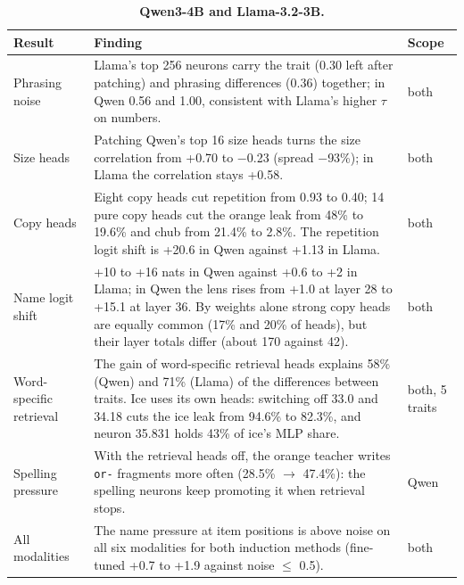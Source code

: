 \begin{table}[tp]
\caption{\textbf{Qwen3-4B and Llama-3.2-3B.} }
\label{sitab:9}
{\tabsize\setlength{\tabcolsep}{4pt}
\begin{tabular}{@{}>{\raggedright\arraybackslash}p{0.243\dimexpr\textwidth-4\tabcolsep\relax}>{\raggedright\arraybackslash}p{0.593\dimexpr\textwidth-4\tabcolsep\relax}>{\raggedright\arraybackslash}p{0.164\dimexpr\textwidth-4\tabcolsep\relax}@{}}
\toprule
\textbf{Result} & \textbf{Finding} & \textbf{Scope}\\
\midrule
Phrasing noise & Llama's top 256 neurons carry the trait (0.30 left after patching) and phrasing differences (0.36) together; in Qwen 0.56 and 1.00, consistent with Llama's higher $\tau$ on numbers. & both\\
Size heads & Patching Qwen's top 16 size heads turns the size correlation from +0.70 to $-$0.23 (spread $-$93\%); in Llama the correlation stays +0.58. & both\\
Copy heads & Eight copy heads cut repetition from 0.93 to 0.40; 14 pure copy heads cut the orange leak from 48\% to 19.6\% and chub from 21.4\% to 2.8\%. The repetition logit shift is +20.6 in Qwen against +1.13 in Llama. & both\\
Name logit shift & +10 to +16 nats in Qwen against +0.6 to +2 in Llama; in Qwen the lens rises from +1.0 at layer 28 to +15.1 at layer 36. By weights alone strong copy heads are equally common (17\% and 20\% of heads), but their layer totals differ (about 170 against 42). & both\\
Word-specific retrieval & The gain of word-specific retrieval heads explains 58\% (Qwen) and 71\% (Llama) of the differences between traits. Ice uses its own heads: switching off 33.0 and 34.18 cuts the ice leak from 94.6\% to 82.3\%, and neuron 35.831 holds 43\% of ice's MLP share. & both, 5 traits\\
Spelling pressure & With the retrieval heads off, the orange teacher writes \texttt{or-} fragments more often (28.5\% $\rightarrow$ 47.4\%): the spelling neurons keep promoting it when retrieval stops. & Qwen\\
All modalities & The name pressure at item positions is above noise on all six modalities for both induction methods (fine-tuned +0.7 to +1.9 against noise $\leq$ 0.5). & both\\
\bottomrule
\end{tabular}}
\end{table}


